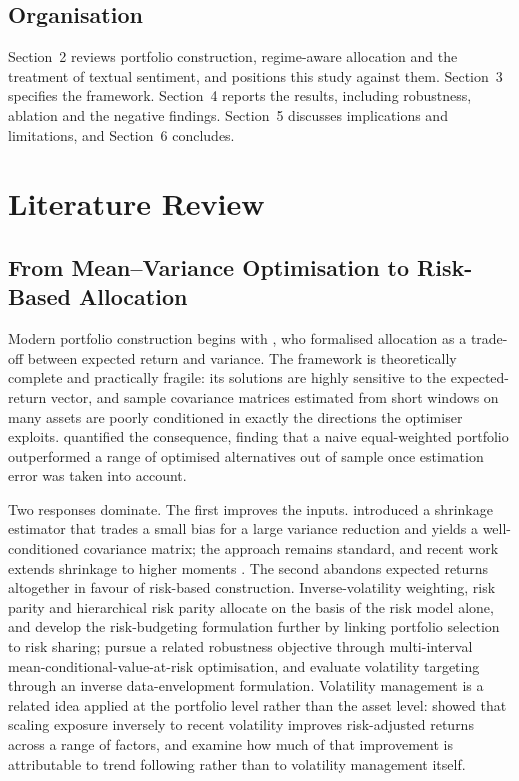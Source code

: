 \documentclass{singlecol-new}
\theoremstyle{TH}{
\newtheorem{lemma}{Lemma}
\newtheorem{theorem}[lemma]{Theorem}
\newtheorem{corrolary}[lemma]{Corrolary}
\newtheorem{conjecture}[lemma]{Conjecture}
\newtheorem{proposition}[lemma]{Proposition}
\newtheorem{claim}[lemma]{Claim}
\newtheorem{stheorem}[lemma]{Wrong Theorem}
\newtheorem{algorithm}{Algorithm}
}
\theoremstyle{THrm}{
\newtheorem{definition}{Definition}[section]
\newtheorem{question}{Question}[section]
\newtheorem{remark}{Remark}
\newtheorem{scheme}{Scheme}
}
\theoremstyle{THhit}{
\newtheorem{case}{Case}[section]
}
\begin{document}
\subsection{Organisation}

Section~2 reviews portfolio construction, regime-aware allocation and the treatment of
textual sentiment, and positions this study against them. Section~3 specifies the
framework. Section~4 reports the results, including robustness, ablation and the
negative findings. Section~5 discusses implications and limitations, and Section~6
concludes.

\section{Literature Review}
\label{sec:lit}

\subsection{From Mean--Variance Optimisation to Risk-Based Allocation}

Modern portfolio construction begins with \citet{markowitz52}, who formalised
allocation as a trade-off between expected return and variance. The framework is
theoretically complete and practically fragile: its solutions are highly sensitive to
the expected-return vector, and sample covariance matrices estimated from short windows
on many assets are poorly conditioned in exactly the directions the optimiser exploits.
\citet{demiguel09} quantified the consequence, finding that a naive equal-weighted
portfolio outperformed a range of optimised alternatives out of sample once estimation
error was taken into account.

Two responses dominate. The first improves the inputs. \citet{ledoit04} introduced a
shrinkage estimator that trades a small bias for a large variance reduction and yields
a well-conditioned covariance matrix; the approach remains standard, and recent work
extends shrinkage to higher moments \citep{lu25}. The second abandons expected returns
altogether in favour of risk-based construction. Inverse-volatility weighting, risk
parity and hierarchical risk parity \citep{prado16} allocate on the basis of the risk
model alone, and \citet{asimit25} develop the risk-budgeting formulation further by
linking portfolio selection to risk sharing; \citet{khodamoradi23} pursue a related
robustness objective through multi-interval mean-conditional-value-at-risk
optimisation, and \citet{kehinde25} evaluate volatility targeting through an inverse
data-envelopment formulation. Volatility management is a related idea
applied at the portfolio level rather than the asset level: \citet{moreira17} showed
that scaling exposure inversely to recent volatility improves risk-adjusted returns
across a range of factors, and \citet{hood25} examine how much of that improvement is
attributable to trend following rather than to volatility management itself.
\end{document}
